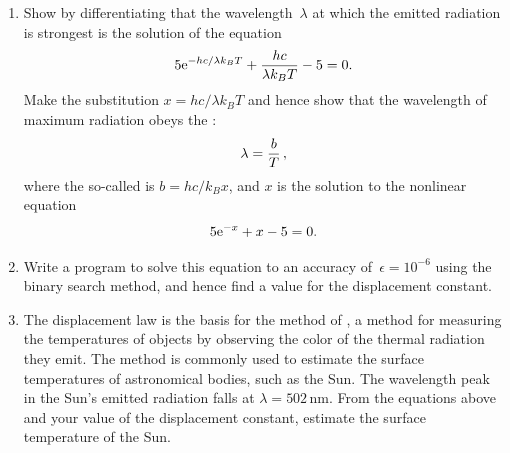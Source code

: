 \documentclass[12pt]{article}
\begin{document}
\begin{exercises}
\begin{enumerate}\setlength{\itemsep}{0pt}
\item Show by differentiating that the wavelength~$\lambda$ at which the
  emitted radiation is strongest is the solution of the equation
\begin{displaymath}
5 \mathrm{e}^{-hc/\lambda k_BT} + {hc\over\lambda k_BT} - 5 = 0.
\end{displaymath}
Make the substitution $x=hc/\lambda k_BT$ and hence show that the
wavelength of maximum radiation obeys the :
\begin{displaymath}
\lambda = {b\over T}\,,
\end{displaymath}
where the so-called  is $b=hc/k_Bx$, and
$x$ is the solution to the nonlinear equation
\begin{displaymath}
5 \mathrm{e}^{-x} + x - 5 = 0.
\end{displaymath}
\item Write a program to solve this equation to an accuracy
  of~$\epsilon=10^{-6}$ using the binary search method, and hence find a
  value for the displacement constant.
\item The displacement law is the basis for the method of
  , a method for measuring the temperatures
  of objects by observing the color of the thermal radiation they emit.
  The method is commonly used to estimate the surface temperatures of
  astronomical bodies, such as the Sun.  The wavelength peak in the
  Sun's emitted radiation falls at $\lambda=502\,\textrm{nm}$.  From the
  equations above and your value of the displacement constant, estimate the
  surface temperature of the Sun.
\end{enumerate}




\end{exercises}
\end{document}
